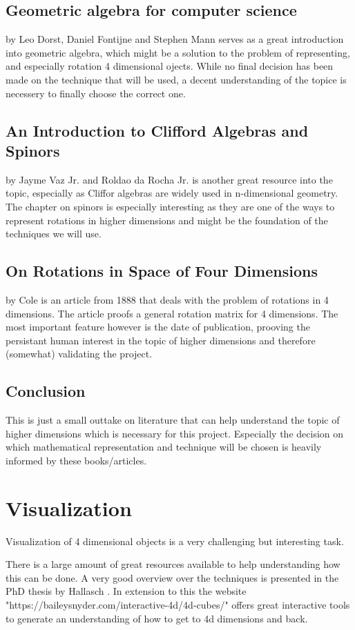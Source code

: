 \documentclass{article}
\begin{document}
\subsection{Geometric algebra for computer science} by Leo Dorst, Daniel Fontijne and Stephen Mann \cite{geo_alg} serves as a great introduction into geometric algebra, which might be a solution to the problem of representing, and especially rotation 4 dimensional ojects. While no final decision has been made on the technique that will be used, a decent understanding of the topice is necessery to finally choose the correct one. 
\subsection{An Introduction to Clifford Algebras and Spinors} by Jayme Vaz Jr. and Roldao da Rocha Jr. \cite{cliff_alg} is another great resource into the topic, especially as Cliffor algebras are widely used in n-dimensional geometry. The chapter on spinors is especially interesting as they are one of the ways to represent rotations in higher dimensions and might be the foundation of the techniques we will use.
\subsection{On Rotations in Space of Four Dimensions} by Cole \cite{rot_n_1} is an article from 1888 that deals with the problem of rotations in 4 dimensions. The article proofs a general rotation matrix for 4 dimensions. The most important feature however is the date of publication, prooving the persistant human interest in the topic of higher dimensions and therefore (somewhat) validating the project.
\subsection{Conclusion}
This is just a small outtake on literature that can help understand the topic of higher dimensions which is necessary for this project. Especially the decision on which mathematical representation and technique will be chosen is heavily informed by these books/articles.
\section{Visualization}

Visualization of 4 dimensional objects is a very challenging but interesting task.

There is a large amount of great resources available to help understanding how this can be done. A very good overview over the techniques is presented in the PhD thesis by Hallasch \cite{4d_vis_1}. In extension to this the website "https://baileysnyder.com/interactive-4d/4d-cubes/" \cite{4d_vis_2} offers great interactive tools to generate an understanding of how to get to 4d dimensions and back.
\end{document}
